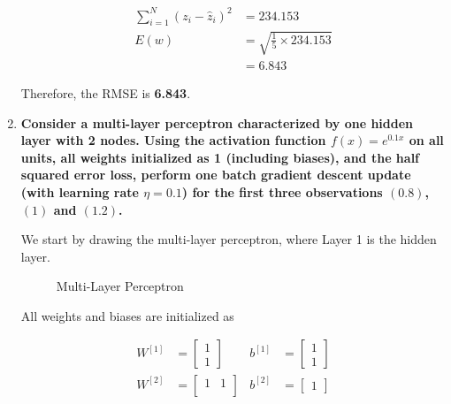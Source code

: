 \documentclass[12pt]{article}
\begin{document}
\begin{enumerate}[leftmargin=\labelsep]
          $$
              \begin{aligned}
                  \sum_{i = 1}^{N} (z_i - \hat{z}_i)^2 & = 234.153                           \\
                  E(w)                                 & = \sqrt{\frac{1}{5} \times 234.153} \\
                                                       & = 6.843
              \end{aligned}
          $$

          Therefore, the RMSE is \textbf{6.843}.

    \item {\color{questioncolor}\bfseries
          Consider a multi-layer perceptron characterized by one hidden layer with 2 nodes.
          Using the activation function $f(x) = e^{0.1 x}$ on all units, all weights
          initialized as 1 (including biases), and the half squared error loss,
          perform one batch gradient descent update (with learning rate $\eta = 0.1$)
          for the first three observations $(0.8)$, $(1)$ and $(1.2)$.
          }\\
          \vspace{0.5em}

          We start by drawing the multi-layer perceptron, where Layer 1 is the hidden layer.

          \begin{figure}[H]
              \centering
              
              \caption{Multi-Layer Perceptron}
              \label{fig:multi-layer-perceptron}
          \end{figure}

          All weights and biases are initialized as

          $$
              \begin{aligned}
                  W^{[1]} & = \begin{bmatrix}
                                  1 \\
                                  1
                              \end{bmatrix} &
                  b^{[1]} & = \begin{bmatrix}
                                  1 \\
                                  1
                              \end{bmatrix}  \\
                  W^{[2]} & = \begin{bmatrix}
                                  1 & 1 \\
                              \end{bmatrix} &
                  b^{[2]} & = \begin{bmatrix}
                                  1
                              \end{bmatrix}
              \end{aligned}
          $$


\end{enumerate}
\end{document}
